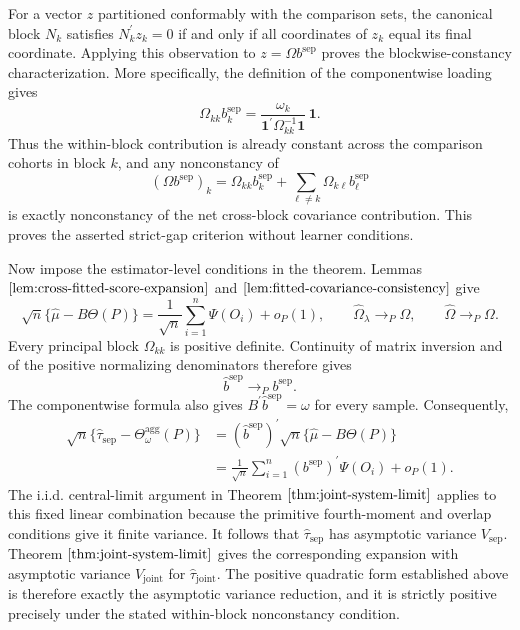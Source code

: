 For a vector \(z\) partitioned conformably with the comparison sets, the canonical block \(N_k\) satisfies \(N_k^{\prime}z_k=0\) if and only if all coordinates of \(z_k\) equal its final coordinate. Applying this observation to \(z=\Omega b^{\mathrm{sep}}\) proves the blockwise-constancy characterization. More specifically, the definition of the componentwise loading gives
\[
\Omega_{kk}b_k^{\mathrm{sep}}
=\frac{\omega_k}{\mathbf 1^{\prime}\Omega_{kk}^{-1}\mathbf 1}\,\mathbf 1.
\]
Thus the within-block contribution is already constant across the comparison cohorts in block \(k\), and any nonconstancy of
\[
(\Omega b^{\mathrm{sep}})_k
=\Omega_{kk}b_k^{\mathrm{sep}}
 +\sum_{\ell\ne k}\Omega_{k\ell}b_\ell^{\mathrm{sep}}
\]
is exactly nonconstancy of the net cross-block covariance contribution. This proves the asserted strict-gap criterion without learner conditions.

Now impose the estimator-level conditions in the theorem. Lemmas \(\ref{lem:cross-fitted-score-expansion}\) and \(\ref{lem:fitted-covariance-consistency}\) give
\[
\sqrt n\{\widehat\mu-B\Theta(P)\}
=\frac{1}{\sqrt n}\sum_{i=1}^n\Psi(O_i)+o_P(1),
\qquad
\widehat\Omega_\lambda\to_P\Omega,
\qquad
\widehat\Omega\to_P\Omega.
\]
Every principal block \(\Omega_{kk}\) is positive definite. Continuity of matrix inversion and of the positive normalizing denominators therefore gives
\[
\widehat b^{\mathrm{sep}}\to_Pb^{\mathrm{sep}}.
\]
The componentwise formula also gives \(B^{\prime}\widehat b^{\mathrm{sep}}=\omega\) for every sample. Consequently,
\[
\begin{aligned}
\sqrt n\{\widehat\tau_{\mathrm{sep}}-\Theta_\omega^{\mathrm{agg}}(P)\}
&=(\widehat b^{\mathrm{sep}})^{\prime}
  \sqrt n\{\widehat\mu-B\Theta(P)\}\\
&=\frac{1}{\sqrt n}\sum_{i=1}^n
  (b^{\mathrm{sep}})^{\prime}\Psi(O_i)+o_P(1).
\end{aligned}
\]
The i.i.d. central-limit argument in Theorem \(\ref{thm:joint-system-limit}\) applies to this fixed linear combination because the primitive fourth-moment and overlap conditions give it finite variance. It follows that \(\widehat\tau_{\mathrm{sep}}\) has asymptotic variance \(V_{\mathrm{sep}}\). Theorem \(\ref{thm:joint-system-limit}\) gives the corresponding expansion with asymptotic variance \(V_{\mathrm{joint}}\) for \(\widehat\tau_{\mathrm{joint}}\). The positive quadratic form established above is therefore exactly the asymptotic variance reduction, and it is strictly positive precisely under the stated within-block nonconstancy condition.

